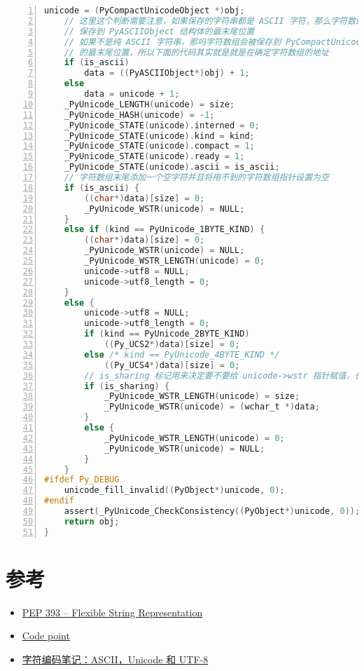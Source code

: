 \begin{lstlisting}[language=C, numbers=left, numbersep=1em, numberstyle=\footnotesize , breaklines=true]
    unicode = (PyCompactUnicodeObject *)obj;
    // 这里这个判断需要注意，如果保存的字符串都是 ASCII 字符，那么字符数组会被
    // 保存到 PyASCIIObject 结构体的最末尾位置
    // 如果不是纯 ASCII 字符串，那吗字符数组会被保存到 PyCompactUnicodeObject 结构体
    // 的最末尾位置，所以下面的代码其实就是就是在确定字符数组的地址
    if (is_ascii)
        data = ((PyASCIIObject*)obj) + 1;
    else
        data = unicode + 1;
    _PyUnicode_LENGTH(unicode) = size;
    _PyUnicode_HASH(unicode) = -1;
    _PyUnicode_STATE(unicode).interned = 0;
    _PyUnicode_STATE(unicode).kind = kind;
    _PyUnicode_STATE(unicode).compact = 1;
    _PyUnicode_STATE(unicode).ready = 1;
    _PyUnicode_STATE(unicode).ascii = is_ascii;
    // 字符数组末尾添加一个空字符并且将用不到的字符数组指针设置为空
    if (is_ascii) {
        ((char*)data)[size] = 0;
        _PyUnicode_WSTR(unicode) = NULL;
    }
    else if (kind == PyUnicode_1BYTE_KIND) {
        ((char*)data)[size] = 0;
        _PyUnicode_WSTR(unicode) = NULL;
        _PyUnicode_WSTR_LENGTH(unicode) = 0;
        unicode->utf8 = NULL;
        unicode->utf8_length = 0;
    }
    else {
        unicode->utf8 = NULL;
        unicode->utf8_length = 0;
        if (kind == PyUnicode_2BYTE_KIND)
            ((Py_UCS2*)data)[size] = 0;
        else /* kind == PyUnicode_4BYTE_KIND */
            ((Py_UCS4*)data)[size] = 0;
        // is_sharing 标记用来决定要不要给 unicode->wstr 指针赋值，也指向保存字符数组的位置
        if (is_sharing) {
            _PyUnicode_WSTR_LENGTH(unicode) = size;
            _PyUnicode_WSTR(unicode) = (wchar_t *)data;
        }
        else {
            _PyUnicode_WSTR_LENGTH(unicode) = 0;
            _PyUnicode_WSTR(unicode) = NULL;
        }
    }
#ifdef Py_DEBUG
    unicode_fill_invalid((PyObject*)unicode, 0);
#endif
    assert(_PyUnicode_CheckConsistency((PyObject*)unicode, 0));
    return obj;
}
\end{lstlisting}








\section{参考}

\begin{itemize}
\item \href{https://peps.python.org/pep-0393/}{PEP 393 – Flexible String Representation}
\item \href{https://developer.mozilla.org/en-US/docs/Glossary/code_point}{Code point}
\item \href{https://www.ruanyifeng.com/blog/2007/10/ascii_unicode_and_utf-8.html}{字符编码笔记：ASCII，Unicode 和 UTF-8}
\end{itemize}